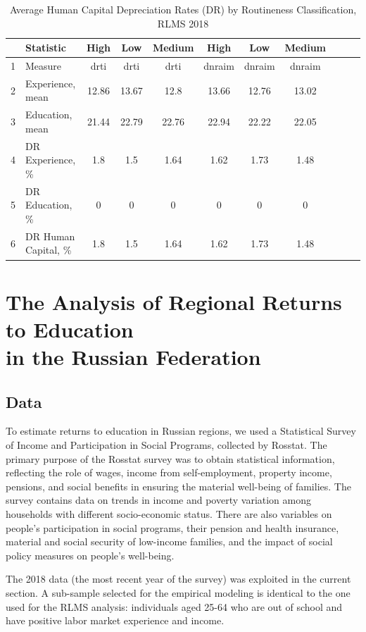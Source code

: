 \documentclass[12pt,a4paper]{article}
\numberwithin{equation}{section}
\begin{document}
\begin{table}[H]
	\centering
	\caption{Average Human Capital Depreciation Rates (DR) by Routineness Classification, RLMS 2018}
	\label{tab:7}
	\begin{tabular}{clccccccccc}
		\hline
		& \textbf{Statistic} & \textbf{High} & \textbf{Low} & \textbf{Medium} & \textbf{High} & \textbf{Low} & \textbf{Medium} \\ 
		\hline
		1 & Measure & drti & drti & drti & dnraim & dnraim & dnraim \\ 
		2 & Experience, mean & 12.86 & 13.67 & 12.8 & 13.66 & 12.76 & 13.02 \\ 
		3 & Education, mean & 21.44 & 22.79 & 22.76 & 22.94 & 22.22 & 22.05 \\ 
		\midrule
		4 & DR Experience, \% & 1.8 & 1.5 & 1.64 & 1.62 & 1.73 & 1.48 \\ 
		5 & DR Education, \% & 0 & 0 & 0 & 0 & 0 & 0 \\ 
		6 & DR Human Capital, \% & 1.8 & 1.5 & 1.64 & 1.62 & 1.73 & 1.48 \\ 
		\hline
	\end{tabular}
\end{table}

\section{The Analysis of Regional Returns to Education \\ in the Russian Federation}

\subsection{Data}
To estimate returns to education in Russian regions, we used a Statistical Survey of Income and Participation in Social Programs, collected by Rosstat. The primary purpose of the Rosstat survey was to obtain statistical information, reflecting the role of wages, income from self-employment, property income, pensions, and social benefits in ensuring the material well-being of families. The survey contains data on trends in income and poverty variation among households with different socio-economic status. There are also variables on people's participation in social programs, their pension and health insurance, material and social security of low-income families, and the impact of social policy measures on people's well-being.

The 2018 data (the most recent year of the survey) was exploited in the current section. A sub-sample selected for the empirical modeling is identical to the one used for the RLMS analysis: individuals aged 25-64 who are out of school and have positive labor market experience and income.
\end{document}
